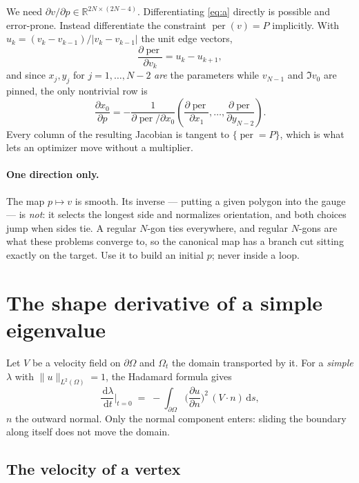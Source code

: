 \documentclass[11pt]{article}
\newcommand{\dd}{\,\mathrm{d}}
\newcommand{\Om}{\Omega}
\newcommand{\bd}{\partial\Omega}
\newcommand{\pdn}[1]{\frac{\partial #1}{\partial n}}
\theoremstyle{definition}
\begin{document}
We need $\partial v/\partial p\in\mathbb{R}^{2N\times(2N-4)}$. Differentiating \eqref{eq:a}
directly is possible and error-prone. Instead differentiate the constraint
$\operatorname{per}(v)=P$ implicitly. With $u_k=(v_k-v_{k-1})/|v_k-v_{k-1}|$ the unit edge
vectors,
\begin{equation}\label{eq:pergrad}
  \frac{\partial \operatorname{per}}{\partial v_k}=u_k-u_{k+1},
\end{equation}
and since $x_j,y_j$ for $j=1,\dots,N-2$ \emph{are} the parameters while $v_{N-1}$ and $\Im v_0$
are pinned, the only nontrivial row is
\begin{equation}\label{eq:implicit}
  \frac{\partial x_0}{\partial p}
  =-\frac{1}{\partial\operatorname{per}/\partial x_0}
    \left(\frac{\partial\operatorname{per}}{\partial x_1},\dots,
          \frac{\partial\operatorname{per}}{\partial y_{N-2}}\right).
\end{equation}
Every column of the resulting Jacobian is tangent to $\{\operatorname{per}=P\}$, which is what
lets an optimizer move without a multiplier.

\paragraph{One direction only.} The map $p\mapsto v$ is smooth. Its inverse --- putting a given
polygon into the gauge --- is \emph{not}: it selects the longest side and normalizes orientation,
and both choices jump when sides tie. A regular $N$-gon ties everywhere, and regular $N$-gons are
what these problems converge to, so the canonical map has a branch cut sitting exactly on the
target. Use it to build an initial $p$; never inside a loop.

\section{The shape derivative of a simple eigenvalue}

Let $V$ be a velocity field on $\bd$ and $\Om_t$ the domain transported by it. For a
\emph{simple} $\lambda$ with $\|u\|_{L^2(\Om)}=1$, the Hadamard formula gives
\begin{equation}\label{eq:hadamard}
  \frac{\dd\lambda}{\dd t}\bigg|_{t=0}
  \;=\;-\int_{\bd}\Big(\pdn{u}\Big)^{\!2}\,(V\!\cdot\!n)\dd s ,
\end{equation}
$n$ the outward normal. Only the normal component enters: sliding the boundary along itself does
not move the domain.

\subsection{The velocity of a vertex}
\end{document}
